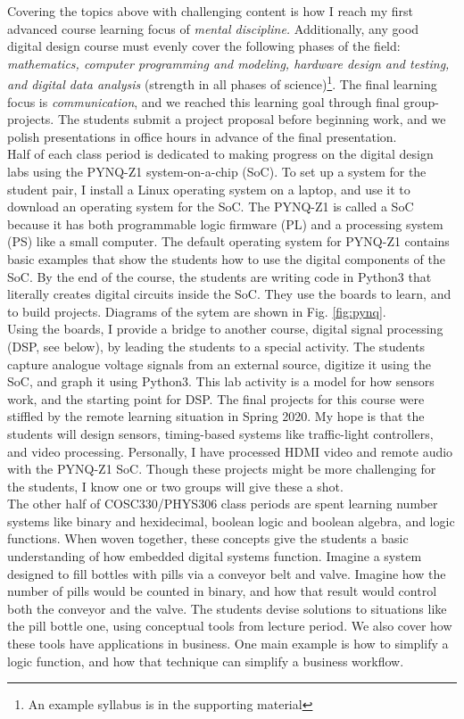 \documentclass[../../../main.tex]{subfiles}
\begin{document}
Covering the topics above with challenging content is how I reach my first advanced course learning focus of \textit{mental discipline.}  Additionally, any good digital design course must evenly cover the following phases of the field: \textit{mathematics, computer programming and modeling, hardware design and testing, and digital data analysis} (strength in all phases of science)\footnote{An example syllabus is in the supporting material}.  The final learning focus is \textit{communication}, and we reached this learning goal through final group-projects.  The students submit a project proposal before beginning work, and we polish presentations in office hours in advance of the final presentation.
\\
\vspace{0.25cm}
Half of each class period is dedicated to making progress on the digital design labs using the PYNQ-Z1 system-on-a-chip (SoC).  To set up a system for the student pair, I install a Linux operating system on a laptop, and use it to download an operating system for the SoC.  The PYNQ-Z1 is called a SoC because it has both programmable logic firmware (PL) and a processing system (PS) like a small computer.  The default operating system for PYNQ-Z1 contains basic examples that show the students how to use the digital components of the SoC.  By the end of the course, the students are writing code in Python3 that literally creates digital circuits inside the SoC.  They use the boards to learn, and to build projects.  Diagrams of the sytem are shown in Fig. \ref{fig:pynq}.
\\
\vspace{0.25cm}
Using the boards, I provide a bridge to another course, digital signal processing (DSP, see below), by leading the students to a special activity.  The students capture analogue voltage signals from an external source, digitize it using the SoC, and graph it using Python3.  This lab activity is a model for how sensors work, and the starting point for DSP.  The final projects for this course were stiffled by the remote learning situation in Spring 2020.  My hope is that the students will design sensors, timing-based systems like traffic-light controllers, and video processing.  Personally, I have processed HDMI video and remote audio with the PYNQ-Z1 SoC.  Though these projects might be more challenging for the students, I know one or two groups will give these a shot.
\\
\vspace{0.25cm}
The other half of COSC330/PHYS306 class periods are spent learning number systems like binary and hexidecimal, boolean logic and boolean algebra, and logic functions.  When woven together, these concepts give the students a basic understanding of how embedded digital systems function.  Imagine a system designed to fill bottles with pills via a conveyor belt and valve.  Imagine how the number of pills would be counted in binary, and how that result would control both the conveyor and the valve.  The students devise solutions to situations like the pill bottle one, using conceptual tools from lecture period.  We also cover how these tools have applications in business.  One main example is how to simplify a logic function, and how that technique can simplify a business workflow.
\end{document}
